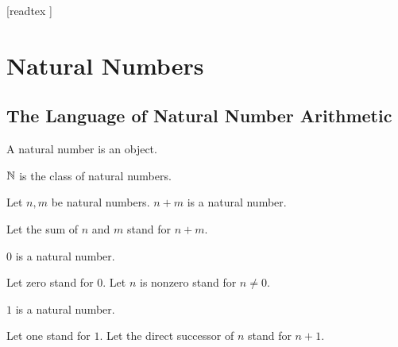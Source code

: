 \documentclass[10pt]{article}
\begin{document}
  \begin{imports}
    \begin{forthel}
      [readtex ]
    \end{forthel}
  \end{imports}


  \section*{Natural Numbers}

  \subsection*{The Language of Natural Number Arithmetic}

  \begin{forthel}
    \begin{signature}[id=ARITHMETIC_01_3074681254969344,printid]
      A natural number is an object.
    \end{signature}
  \end{forthel}

  \begin{forthel}
    \begin{definition}[id=ARITHMETIC_01_7367148418629632,printid]
      $\mathbb{N}$ is the class of natural numbers.
    \end{definition}
  \end{forthel}

  \begin{forthel}
    \begin{signature}[id=ARITHMETIC_01_1567933815848960,printid]
      Let $n, m$ be natural numbers.
      $n + m$ is a natural number.
    \end{signature}

    Let the sum of $n$ and $m$ stand for $n + m$.
  \end{forthel}

  \begin{forthel}
    \begin{signature}[id=ARITHMETIC_01_7633304715001856,printid]
      $0$ is a natural number.
    \end{signature}

    Let zero stand for $0$.
    Let $n$ is nonzero stand for $n \neq 0$.
  \end{forthel}

  \begin{forthel}
    \begin{signature}[id=ARITHMETIC_01_1200254566985232,printid]
      $1$ is a natural number.
    \end{signature}

    Let one stand for $1$.
    Let the direct successor of $n$ stand for $n + 1$.
  \end{forthel}
  
\end{document}
